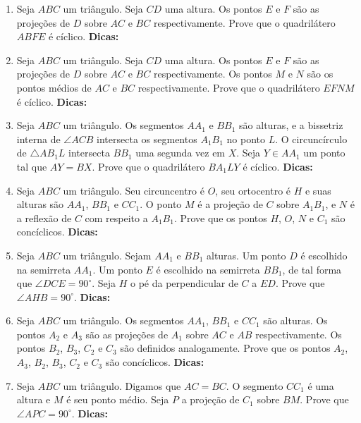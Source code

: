 \documentclass{article}
\newcommand{\dica}{\textbf{Dicas:}}
\newcommand{\iniTri}{Seja $ABC$ um triângulo}
\begin{document}
\begin{multicols}{2}
\begin{enumerate}
    \item \iniTri. Seja $CD$ uma altura. Os pontos $E$ e $F$ são as projeções de $D$ sobre $AC$ e $BC$ respectivamente. Prove que o quadrilátero $ABFE$ é cíclico. \dica %
    
    \item \iniTri. Seja $CD$ uma altura. Os pontos $E$ e $F$ são as projeções de $D$ sobre $AC$ e $BC$ respectivamente. Os pontos $M$ e $N$ são os pontos médios de $AC$ e $BC$ respectivamente. Prove que o quadrilátero $EFNM$ é cíclico. \dica %
    
    \item \iniTri. Os segmentos $AA_1$ e $BB_1$ são alturas, e a bissetriz interna de $\angle ACB$ intersecta os segmentos $A_1B_1$ no ponto $L$. O circuncírculo de $\triangle AB_1L$ intersecta $BB_1$ uma segunda vez em $X$. Seja $Y\in AA_1$ um ponto tal que $AY=BX$. Prove que o quadrilátero $BA_1LY$ é cíclico. \dica %
    
    \item \iniTri. Seu circuncentro é $O$, seu ortocentro é $H$ e suas alturas são $AA_1$, $BB_1$ e $CC_1$. O ponto $M$ é a projeção de $C$ sobre $A_1B_1$, e $N$ é a reflexão de $C$ com respeito a $A_1B_1$. Prove que os pontos $H$, $O$, $N$ e $C_1$ são concíclicos. \dica %
    
    \item \iniTri. Sejam $AA_1$ e $BB_1$ alturas. Um ponto $D$ é escolhido na semirreta $AA_1$. Um ponto $E$ é escolhido na semirreta $BB_1$, de tal forma que $\angle DCE = 90^{\circ}$. Seja $H$ o pé da perpendicular de $C$ a $ED$. Prove que $\angle AHB=90^{\circ}$. \dica %
    
    \item \iniTri. Os segmentos $AA_1$, $BB_1$ e $CC_1$ são alturas. Os pontos $A_2$ e $A_3$ são as projeções de $A_1$ sobre $AC$ e $AB$ respectivamente. Os pontos $B_2$, $B_3$, $C_2$ e $C_3$ são definidos analogamente. Prove que os pontos $A_2$, $A_3$, $B_2$, $B_3$, $C_2$ e $C_3$ são concíclicos. \dica %
    
    \item \iniTri. Digamos que $AC=BC$. O segmento $CC_1$ é uma altura e $M$ é seu ponto médio. Seja $P$ a projeção de $C_1$ sobre $BM$. Prove que $\angle APC=90^{\circ}$. \dica %
    

\end{enumerate}
\end{multicols}
\end{document}
